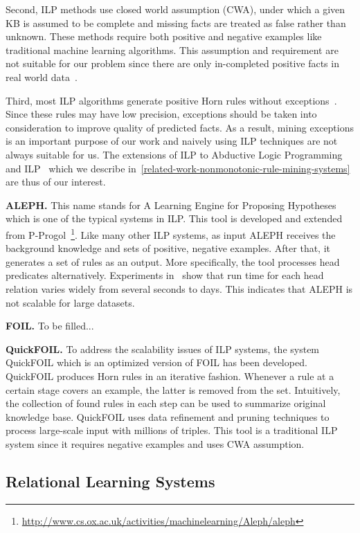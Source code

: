 Second, ILP methods use closed world assumption (CWA), under which a given KB is assumed to be complete and missing facts are treated as false rather than unknown. These methods require both positive and negative examples like traditional machine learning algorithms. This assumption and requirement are not suitable for our problem since there are only in-completed positive facts in real world data~\cite{ref10}.

Third, most ILP algorithms generate positive Horn rules without exceptions~\cite{ref11}. Since these rules may have low precision, exceptions should be taken into consideration to improve quality of predicted facts. As a result, mining exceptions is an important purpose of our work and naively using ILP techniques are not always suitable for us. The extensions of ILP to Abductive Logic Programming and ILP~\cite{ref11} which we describe in~\ref{related-work-nonmonotonic-rule-mining-systems} are thus of our interest.

\textbf{ALEPH.} This name stands for A Learning Engine for Proposing Hypotheses which is one of the typical systems in ILP. This tool is developed and extended from P-Progol~\footnote{\url{http://www.cs.ox.ac.uk/activities/machinelearning/Aleph/aleph}}. Like many other ILP systems, as input ALEPH receives the background knowledge and sets of positive, negative examples. After that, it generates a set of rules as an output. More specifically, the tool processes head predicates alternatively. Experiments in~\cite{ref10} show that run time for each head relation varies widely from several seconds to days. This indicates that ALEPH is not scalable for large datasets.

\textbf{FOIL.} To be filled...

\textbf{QuickFOIL.} To address the scalability issues of ILP systems, the system QuickFOIL which is an optimized version of FOIL has been developed. QuickFOIL produces Horn rules in an iterative fashion. Whenever a rule at a certain stage covers an example, the latter is removed from the set. Intuitively, the collection of found rules in each step can be used to summarize original knowledge base. QuickFOIL uses data refinement and pruning techniques to process large-scale input with millions of triples. This tool is a traditional ILP system since it requires negative examples and uses CWA assumption.

\subsection{Relational Learning Systems}

